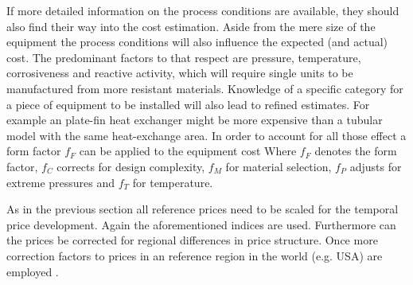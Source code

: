         If more detailed information on the process conditions are available, they should also find their way into the cost estimation.
        Aside from the mere size of the equipment the process conditions will also influence the expected (and actual)
        cost. The predominant factors to that respect are pressure, temperature, corrosiveness
        and reactive activity, which will require single units to be manufactured from more resistant materials. Knowledge
        of a specific category for a piece of equipment to be installed will also lead to refined estimates. For example an plate-fin heat
        exchanger might be more expensive than a tubular model with the same heat-exchange area.
        In order to account for all those effect a form factor $f_F$ can be applied to the equipment cost
        Where $f_F$ denotes the form factor, $f_C$ corrects for design complexity, $f_M$ for material selection,
        $f_P$ adjusts for extreme pressures and $f_T$ for temperature.

        As in the previous section all reference prices need to be scaled for the temporal price
        development. Again the aforementioned indices are used. Furthermore can the prices be corrected for regional
        differences in price structure. Once more correction factors to prices in an reference region in
        the world (e.g. USA) are employed \cite{Peters.2003}.

